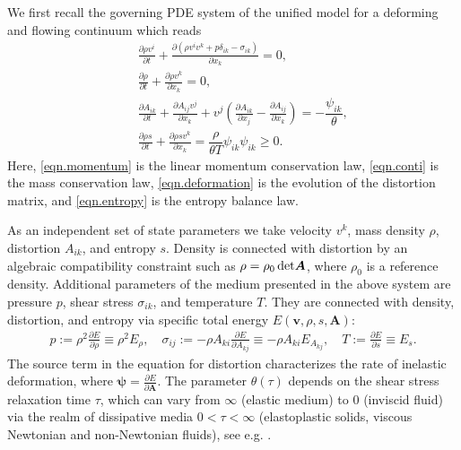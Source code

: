 \documentclass[3p,times,table]{article}
\renewcommand{\AA}{{\bm{A}}}
\newcommand{\vv}{{\bm{v}}}
\begin{document}
We first recall the governing PDE system of the unified model for a deforming 
and flowing
continuum which reads
\begin{subequations}\label{eqn.HPR}
\begin{eqnarray} 
	&&\displaystyle\frac{\partial \rho v^i}{\partial t}+\frac{\partial 
		\left(\rho v^i v^k + p \delta_{ik} - \sigma_{ik} \right)}{\partial x_k}=0, 
	\label{eqn.momentum}\\[2mm]
	&& \frac{\partial \rho}{\partial t}+\frac{\partial \rho v^k}{\partial 
	x_k}=0,\label{eqn.conti}\\[2mm]
	&&\displaystyle\frac{\partial A_{i k}}{\partial t}+\frac{\partial A_{ij} 
		v^j}{\partial x_k}+v^j\left(\frac{\partial A_{ik}}{\partial 
		x_j}-\frac{\partial A_{ij}}{\partial x_k}\right)
	=-\dfrac{ \psi_{ik} }{\theta},\label{eqn.deformation}\\[2mm]
	&&\displaystyle\frac{\partial \rho s}{\partial t}+\frac{\partial \rho 
		s v^k }{\partial x_k}=\dfrac{\rho}{\theta T} 
	\psi_{ik} \psi_{ik} \geq0. 
	\label{eqn.entropy}
\end{eqnarray}
\end{subequations}
Here, \eqref{eqn.momentum} is the linear momentum conservation law, 
\eqref{eqn.conti} 
is the mass conservation law, \eqref{eqn.deformation} is the evolution of the
distortion matrix, and \eqref{eqn.entropy} is the entropy balance law.

As an independent set of state parameters we take 
velocity $v^k$, mass density $\rho$, distortion $A_{ik}$, and entropy $s$.
Density is connected with distortion  by an algebraic compatibility constraint such as 
$\rho=\rho_0 \det\hspace{-0.6mm}\AA$, where $\rho_0$ is a reference density.
Additional parameters of the medium presented in the above system are 
pressure $p$, shear stress $\sigma_{ik}$, and temperature $T$. They are 
connected with density, distortion, and entropy via specific total 
energy 
$E(\vv,\rho,s,\AA)$:
\begin{align}
p:=\rho^2\frac{\partial E}{\partial \rho} \equiv \rho^2 E_\rho, 
\quad 
\sigma_{ij} :=-\rho A_{ki}\frac{\partial E}{\partial A_{kj}} \equiv -\rho 
A_{ki} E_{ 
A_{kj}}, 
\quad 
T:=\frac{\partial E}{\partial s} \equiv E_s.
\end{align}
The source term in the equation for distortion characterizes the rate of inelastic deformation,
where $\bm{\psi}=\frac{\partial E}{\partial \AA}$.
The parameter $\theta(\tau)$ depends on the shear stress relaxation time 
$\tau$, which can vary from $\infty$ (elastic medium) to $0$ (inviscid fluid) 
via the realm of dissipative media $ 0< \tau < \infty $ (elastoplastic solids, 
viscous Newtonian and non-Newtonian fluids), see e.g. 
\cite{Hyper-Hypo2019,HYP2016,Jackson2019a}.
\end{document}
